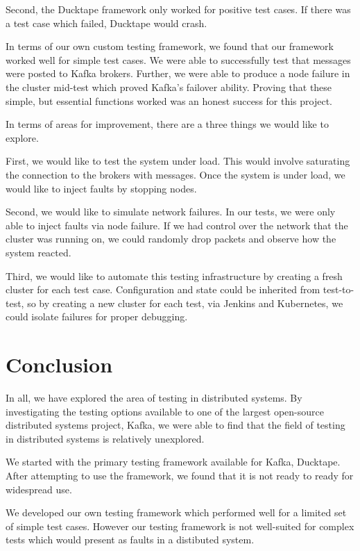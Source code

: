 \begin{multicols}{2}
Second, the Ducktape framework only worked for positive test cases.
If there was a test case which failed, Ducktape would crash.

In terms of our own custom testing framework, we found that our framework worked well for simple test cases.
We were able to successfully test that messages were posted to Kafka brokers.
Further, we were able to produce a node failure in the cluster mid-test which proved Kafka's failover ability.
Proving that these simple, but essential functions worked was an honest success for this project.

In terms of areas for improvement, there are a three things we would like to explore.

First, we would like to test the system under load.
This would involve saturating the connection to the brokers with messages.
Once the system is under load, we would like to inject faults by stopping nodes.

Second, we would like to simulate network failures.
In our tests, we were only able to inject faults via node failure.
If we had control over the network that the cluster was running on, we could randomly drop packets and observe how the system reacted.

Third, we would like to automate this testing infrastructure by creating a fresh cluster for each test case.
Configuration and state could be inherited from test-to-test, so by creating a new cluster for each test, via Jenkins and Kubernetes, we could isolate failures for proper debugging.

\section{Conclusion}

In all, we have explored the area of testing in distributed systems.
By investigating the testing options available to one of the largest open-source distributed systems project, Kafka, we were able to find that the field of testing in distributed systems is relatively unexplored.

We started with the primary testing framework available for Kafka, Ducktape.
After attempting to use the framework, we found that it is not ready to ready for widespread use.

We developed our own testing framework which performed well for a limited set of simple test cases.
However our testing framework is not well-suited for complex tests which would present as faults in a distibuted system.



\end{multicols}
\newpage



